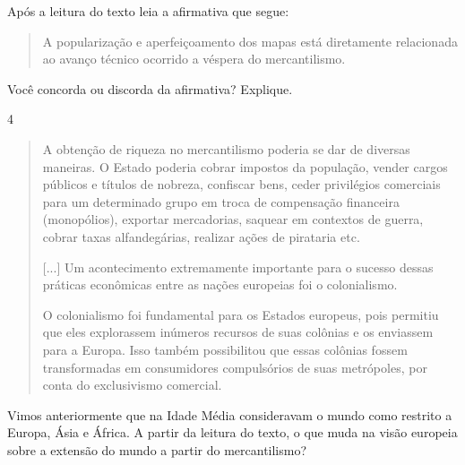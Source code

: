 Após a leitura do texto leia a afirmativa que segue:

\begin{quote}
A popularização e aperfeiçoamento dos mapas está diretamente relacionada
ao avanço técnico ocorrido a véspera do mercantilismo.
\end{quote}

Você concorda ou discorda da afirmativa? Explique.



\num{4}

\begin{quote}
A obtenção de riqueza no mercantilismo poderia se dar de diversas
maneiras. O Estado poderia cobrar impostos da população, vender cargos
públicos e títulos de nobreza, confiscar bens, ceder privilégios
comerciais para um determinado grupo em troca de compensação financeira
(monopólios), exportar mercadorias, saquear em contextos de guerra,
cobrar taxas alfandegárias, realizar ações de pirataria
etc.

{[}...{]} Um acontecimento extremamente importante para o sucesso
dessas práticas econômicas entre as nações europeias foi o
colonialismo.

O colonialismo foi fundamental para os Estados europeus, pois
permitiu que eles explorassem inúmeros recursos de suas colônias e os
enviassem para a Europa. Isso também possibilitou que essas colônias
fossem transformadas em consumidores compulsórios de suas metrópoles,
por conta do exclusivismo comercial.

\end{quote}

Vimos anteriormente que na Idade Média consideravam o mundo como
restrito a Europa, Ásia e África. A partir da leitura do texto, o que
muda na visão europeia sobre a extensão do mundo a partir do
mercantilismo?



